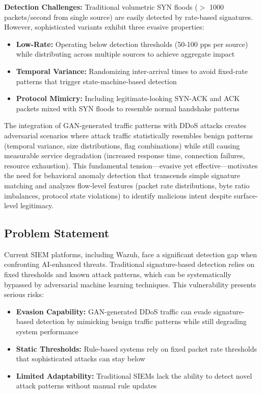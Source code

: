 \textbf{Detection Challenges:} Traditional volumetric SYN floods ($>$ 1000 packets/second from single source) are easily detected by rate-based signatures. However, sophisticated variants exhibit three evasive properties:

\begin{itemize}
    \item \textbf{Low-Rate:} Operating below detection thresholds (50-100 pps per source) while distributing across multiple sources to achieve aggregate impact
    \item \textbf{Temporal Variance:} Randomizing inter-arrival times to avoid fixed-rate patterns that trigger state-machine-based detection
    \item \textbf{Protocol Mimicry:} Including legitimate-looking SYN-ACK and ACK packets mixed with SYN floods to resemble normal handshake patterns
\end{itemize}

The integration of GAN-generated traffic patterns with DDoS attacks creates adversarial scenarios where attack traffic statistically resembles benign patterns (temporal variance, size distributions, flag combinations) while still causing measurable service degradation (increased response time, connection failures, resource exhaustion). This fundamental tension—evasive yet effective—motivates the need for behavioral anomaly detection that transcends simple signature matching and analyzes flow-level features (packet rate distributions, byte ratio imbalances, protocol state violations) to identify malicious intent despite surface-level legitimacy.

\subsection{Problem Statement}

Current SIEM platforms, including Wazuh, face a significant detection gap when confronting AI-enhanced threats. Traditional signature-based detection relies on fixed thresholds and known attack patterns, which can be systematically bypassed by adversarial machine learning techniques. This vulnerability presents serious risks:

\begin{itemize}
    \item \textbf{Evasion Capability:} GAN-generated DDoS traffic can evade signature-based detection by mimicking benign traffic patterns while still degrading system performance
    \item \textbf{Static Thresholds:} Rule-based systems rely on fixed packet rate thresholds that sophisticated attacks can stay below
    \item \textbf{Limited Adaptability:} Traditional SIEMs lack the ability to detect novel attack patterns without manual rule updates
\end{itemize}

